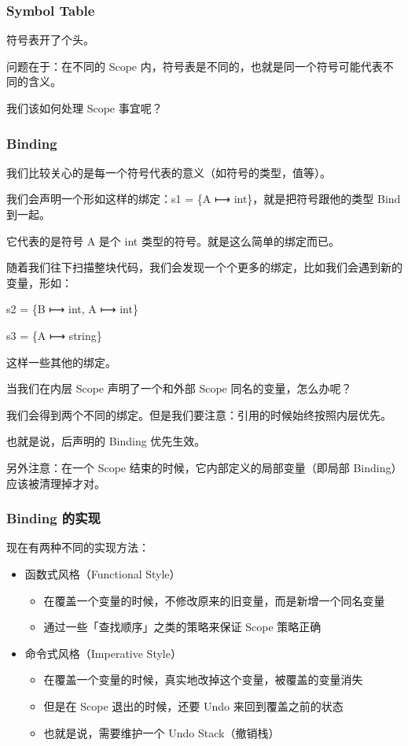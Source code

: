 \documentclass[
]{article}
\begin{document}
\hypertarget{header-n16}{%
\subsubsection{Symbol Table}\label{header-n16}}

符号表开了个头。

问题在于：在不同的 Scope
内，符号表是不同的，也就是同一个符号可能代表不同的含义。

我们该如何处理 Scope 事宜呢？

\hypertarget{header-n20}{%
\subsubsection{Binding}\label{header-n20}}

我们比较关心的是每一个符号代表的意义（如符号的类型，值等）。

我们会声明一个形如这样的绑定：s1 = \{A ⟼ int\}，就是把符号跟他的类型
Bind 到一起。

它代表的是符号 A 是个 int 类型的符号。就是这么简单的绑定而已。

随着我们往下扫描整块代码，我们会发现一个个更多的绑定，比如我们会遇到新的变量，形如：

s2 = \{B ⟼ int, A ⟼ int\}

s3 = \{A ⟼ string\}

这样一些其他的绑定。

当我们在内层 Scope 声明了一个和外部 Scope 同名的变量，怎么办呢？

我们会得到两个不同的绑定。但是我们要注意：引用的时候始终按照内层优先。

也就是说，后声明的 Binding 优先生效。

另外注意：在一个 Scope 结束的时候，它内部定义的局部变量（即局部
Binding）应该被清理掉才对。

\hypertarget{header-n32}{%
\subsubsection{Binding 的实现}\label{header-n32}}

现在有两种不同的实现方法：

\begin{itemize}
\item
  函数式风格（Functional Style）

  \begin{itemize}
  \item
    在覆盖一个变量的时候，不修改原来的旧变量，而是新增一个同名变量
  \item
    通过一些「查找顺序」之类的策略来保证 Scope 策略正确
  \end{itemize}
\item
  命令式风格（Imperative Style）

  \begin{itemize}
  \item
    在覆盖一个变量的时候，真实地改掉这个变量，被覆盖的变量消失
  \item
    但是在 Scope 退出的时候，还要 Undo 来回到覆盖之前的状态
  \item
    也就是说，需要维护一个 Undo Stack（撤销栈）
  \end{itemize}
\end{itemize}
\end{document}
